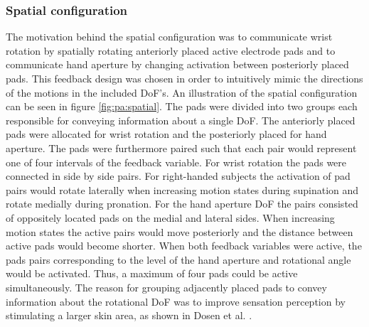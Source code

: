 \subsubsection{Spatial configuration}

The motivation behind the spatial configuration was to communicate wrist rotation by spatially rotating anteriorly placed active electrode pads and to communicate hand aperture by changing activation between posteriorly placed pads. 
This feedback design was chosen in order to intuitively mimic the directions of the motions in the included DoF's. An illustration of the spatial configuration can be seen in figure \ref{fig:pa:spatial}. The pads were divided into two groups each responsible for conveying information about a single DoF. The anteriorly placed pads were allocated for wrist rotation and the posteriorly placed for hand aperture. The pads were furthermore paired such that each pair would represent one of four intervals of the feedback variable. For wrist rotation the pads were connected in side by side pairs. For right-handed subjects the activation of pad pairs would rotate laterally when increasing motion states during supination and rotate medially during pronation. For the hand aperture DoF the pairs consisted of oppositely located pads on the medial and lateral sides. When increasing motion states the active pairs would move posteriorly and the distance between active pads would become shorter. When both feedback variables were active, the pads pairs corresponding to the level of the hand aperture and rotational angle would be activated. Thus, a maximum of four pads could be active simultaneously. The reason for grouping adjacently placed pads to convey information about the rotational DoF was to improve sensation perception by stimulating a larger skin area, as shown in Dosen et al. \cite{Dosen2015}. 
